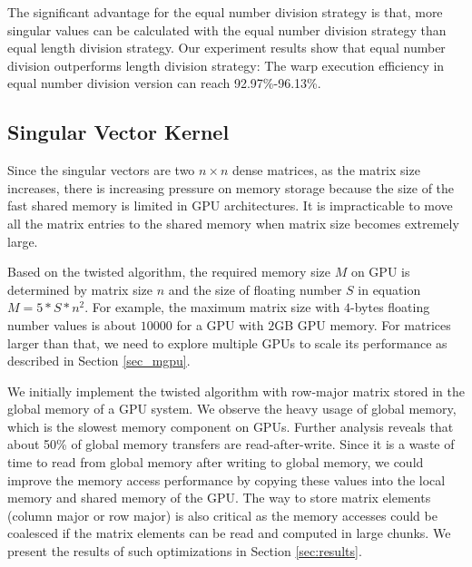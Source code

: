 %

The significant advantage for the equal number division strategy is that, more singular values can be calculated with the equal number division strategy than equal length division strategy.
Our experiment results show that equal number division outperforms length division strategy:
The warp execution efficiency in equal number division version can reach 92.97\%-96.13\%.

\vspace{-0.1in}
\subsection{Singular Vector Kernel} \label{sec_svector}
\vspace{-0.1in}
Since the singular vectors are two $n\times n$ dense matrices, as the matrix size increases, there is increasing pressure on memory storage because the size of the fast shared memory is limited in GPU architectures.
It is impracticable to move all the matrix entries to the shared memory when matrix size becomes extremely large.

Based on the twisted algorithm, the required memory size $M$ on GPU is determined by matrix size $n$ and the size of floating number $S$ in equation $M = 5 * S * n^2$.
For example, the maximum matrix size with $4$-bytes floating number values is about $10000$ for a GPU with $2$GB GPU memory. 
For matrices larger than that, we need to explore multiple GPUs to scale its performance as described in Section \ref{sec_mgpu}.

We initially implement the twisted algorithm with row-major matrix stored in the global memory
of a GPU system. 
We observe the heavy usage of global memory, which is
the slowest memory component on GPUs. 
Further analysis reveals that about 50\% of global memory transfers are read-after-write. Since it is a waste of time to read from global memory after writing to global memory,
we could improve the memory access performance by copying these values into the local memory and shared memory of the GPU.
The way to store matrix elements (column major or row major) is also critical as the memory accesses could be coalesced if the matrix elements
can be read and computed in large chunks. We present the results
of such optimizations in Section \ref{sec:results}.

